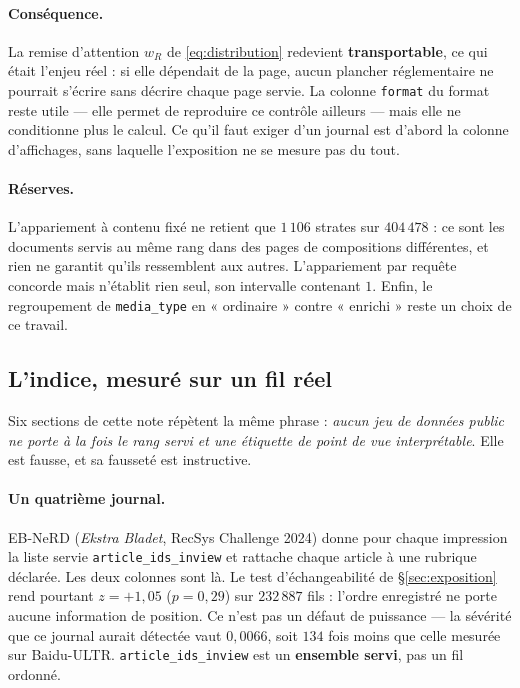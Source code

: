 \documentclass[11pt,a4paper]{article}
\begin{document}
\paragraph{Conséquence.} La remise d'attention $w_R$ de \eqref{eq:distribution} redevient
\textbf{transportable}, ce qui était l'enjeu réel : si elle dépendait de la page, aucun plancher
réglementaire ne pourrait s'écrire sans décrire chaque page servie. La colonne \texttt{format}
du format reste utile --- elle permet de reproduire ce contrôle ailleurs --- mais
elle ne conditionne plus le calcul. Ce qu'il faut exiger d'un journal est d'abord la colonne
d'affichages, sans laquelle l'exposition ne se mesure pas du tout.

\paragraph{Réserves.} L'appariement à contenu fixé ne retient que $1\,106$ strates sur
$404\,478$ : ce sont les documents servis au même rang dans des pages de compositions
différentes, et rien ne garantit qu'ils ressemblent aux autres. L'appariement par requête
concorde mais n'établit rien seul, son intervalle contenant $1$. Enfin, le regroupement de
\texttt{media\_type} en « ordinaire » contre « enrichi » reste un choix de ce travail.

\subsection{L'indice, mesuré sur un fil réel}
\label{sec:indicemesure}

Six sections de cette note répètent la même phrase : \emph{aucun jeu de données public ne porte à
la fois le rang servi et une étiquette de point de vue interprétable}. Elle est fausse, et sa
fausseté est instructive.

\paragraph{Un quatrième journal.} EB-NeRD (\emph{Ekstra Bladet}, RecSys Challenge 2024) donne
pour chaque impression la liste servie \texttt{article\_ids\_inview} et rattache chaque article à
une rubrique déclarée. Les deux colonnes sont là. Le test d'échangeabilité de
\S\ref{sec:exposition} rend pourtant $z = +1{,}05$ ($p = 0{,}29$) sur $232\,887$ fils : l'ordre
enregistré ne porte aucune information de position. Ce n'est pas un défaut de puissance --- la
sévérité que ce journal aurait détectée vaut $0{,}0066$, soit $134$ fois moins que celle mesurée
sur Baidu-ULTR. \texttt{article\_ids\_inview} est un \textbf{ensemble servi}, pas un fil ordonné.
\end{document}
